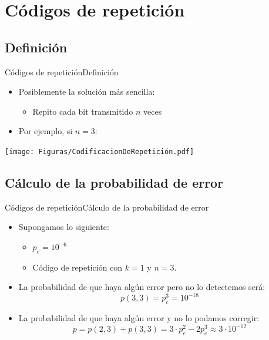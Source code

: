 \documentclass[10pt,compress]{beamer} %
\begin{document}
\section{Códigos de repetición}

\subsection{Definición}
\begin{frame}{Códigos de repetición}{Definición}
	\begin{itemize}
		\item Posiblemente la solución más sencilla:
		\begin{itemize}
			\item Repito cada bit transmitido $n$ veces
		\end{itemize}
		\item Por ejemplo, si $n=3$:
	\end{itemize}
	\centering \texttt{[image: Figuras/CodificacionDeRepetición.pdf]}
\end{frame}

\subsection{Cálculo de la probabilidad de error}
\begin{frame}{Códigos de repetición}{Cálculo de la probabilidad de error}
\begin{itemize}
  \item Supongamos lo siguiente:
  \begin{itemize}
    \item $p_e = 10^{-6}$
    \item Código de repetición con $k=1$ y $n=3$.
  \end{itemize}
  \item La probabilidad de que haya algún error pero no lo detectemos será:
  \begin{displaymath}
    p(3,3) = p_e^3 = 10^{-18}
  \end{displaymath}
  \item La probabilidad de que haya algún error y no lo podamos corregir:
  \begin{displaymath}
    p = p(2,3) + p(3,3) = 3 \cdot p_e^2 - 2p_e^3 \approx 3 \cdot 10^{-12}
  \end{displaymath}
\end{itemize}
\end{frame}
\end{document}
